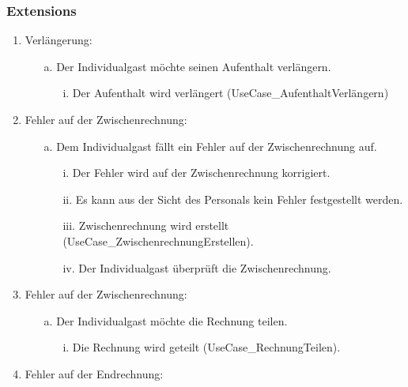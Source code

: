 \documentclass[./detailed_overview_usecases.tex]{subfiles}
\begin{document}
    \subsubsection*{Extensions}
    \begin{enumerate}
        \item Verlängerung:
                \begin{itemize}
                       \item[a.] Der Individualgast möchte seinen Aufenthalt verlängern.
                            \begin{itemize}
                                \item[i.] Der Aufenthalt wird verlängert (UseCase_AufenthaltVerlängern)
                            \end{itemize}
                \end{itemize}
        \setcounter{emuni}{2}
        \item Fehler auf der Zwischenrechnung:
            \begin{itemize}
                \item[a.] Dem Individualgast fällt ein Fehler auf der Zwischenrechnung auf.
                \begin{itemize}
                    \item[i.] Der Fehler wird auf der Zwischenrechnung korrigiert.
                    \item[ii.] Es kann aus der Sicht des Personals kein Fehler festgestellt werden.
                    \item[iii.] Zwischenrechnung wird erstellt (UseCase_ZwischenrechnungErstellen).
                    \item[iv.] Der Individualgast überprüft die Zwischenrechnung.
                \end{itemize}
            \end{itemize}
        \setcounter{emuni}{2}
        \item Fehler auf der Zwischenrechnung:
        \begin{itemize}
            \item[a.] Der Individualgast möchte die Rechnung teilen.
            \begin{itemize}
                \item[i.] Die Rechnung wird geteilt (UseCase_RechnungTeilen).
            \end{itemize}
        \end{itemize}
        \item Fehler auf der Endrechnung:

\end{enumerate}
\end{document}
